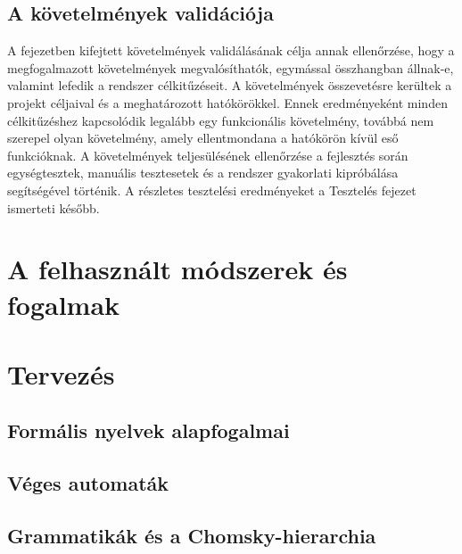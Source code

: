 \subsection{A követelmények validációja}
A fejezetben kifejtett követelmények validálásának célja annak ellenőrzése,
 hogy a megfogalmazott követelmények megvalósíthatók, egymással összhangban
  állnak-e, valamint lefedik a rendszer célkitűzéseit.
   A követelmények összevetésre kerültek a projekt céljaival és a 
   meghatározott hatókörökkel. 
   Ennek eredményeként minden célkitűzéshez kapcsolódik legalább 
   egy funkcionális követelmény, továbbá nem szerepel olyan követelmény, 
   amely ellentmondana a hatókörön kívül eső funkcióknak. 
   A követelmények teljesülésének ellenőrzése a fejlesztés során 
   egységtesztek, manuális tesztesetek és a rendszer gyakorlati 
   kipróbálása segítségével történik.
    A részletes tesztelési eredményeket a Tesztelés fejezet ismerteti később.
\section{A felhasznált módszerek és fogalmak}
\section{Tervezés}
\iffalse

\subsection{Formális nyelvek alapfogalmai}
\mbox{}

\subsection{Véges automaták}
\mbox{}

\subsection{Grammatikák és a Chomsky-hierarchia}
\mbox{}

